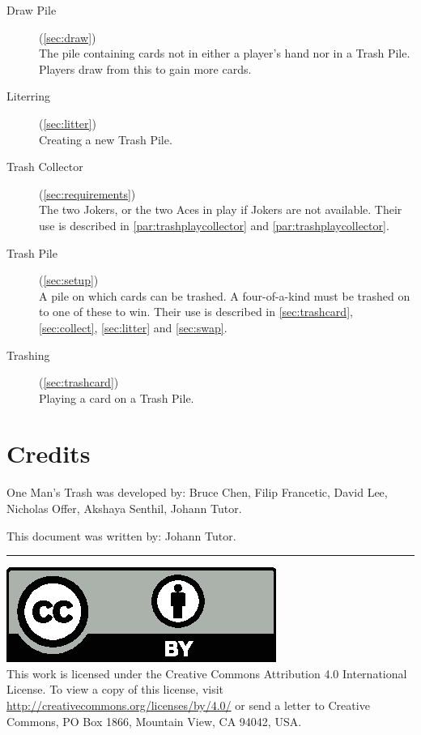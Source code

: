 \documentclass{article}
\newcommand\thegame{One Man's Trash}
\newcommand\copyrightfooter{
  \medskip
  \hrule

  {
    \small
    \includegraphics[scale=0.5]{cc-by.eps}\\
    This work is licensed under the Creative Commons Attribution 4.0
    International License. To view a copy of this license, visit
    \url{http://creativecommons.org/licenses/by/4.0/} or send a letter to Creative Commons, PO Box 1866, Mountain View, CA 94042, USA.
  }
}
\begin{document}
\begin{description}
  \item[Draw Pile] (\autoref{sec:draw})\\
    The pile containing cards not in either a player's hand nor in a Trash Pile. Players draw from this to gain more cards.
  \item[Literring] (\autoref{sec:litter})\\
    Creating a new Trash Pile.
  \item[Trash Collector] (\autoref{sec:requirements})\\
    The two Jokers, or the two Aces in play if Jokers are not available. Their use is described in \autoref{par:trashplaycollector} and \autoref{par:trashplaycollector}.
  \item[Trash Pile] (\autoref{sec:setup})\\
    A pile on which cards can be trashed. A four-of-a-kind must be trashed on to one of these to win. Their use is described in \autoref{sec:trashcard}, \autoref{sec:collect}, \autoref{sec:litter} and \autoref{sec:swap}.
  \item[Trashing] (\autoref{sec:trashcard})\\
    Playing a card on a Trash Pile.
\end{description}

\newpage
\section{Credits}
\label{sec:credits}

\thegame{} was developed by:
Bruce Chen,
Filip Francetic,
David Lee,
Nicholas Offer,
Akshaya Senthil,
Johann Tutor.

This document was written by:
Johann Tutor.

\copyrightfooter
\end{document}
